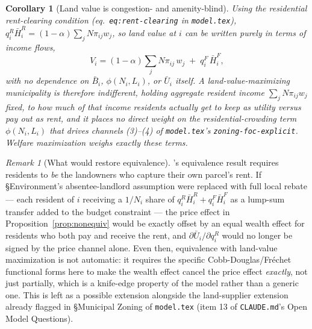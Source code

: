 \documentclass[12pt, a4paper]{article}
\theoremstyle{plain}
\newtheorem{corollary}{Corollary}[proposition]
\theoremstyle{remark}
\newtheorem*{remark}{Remark}
\begin{document}
\begin{corollary}[Land value is congestion- and amenity-blind]
\label{cor:blind}
Using the residential rent-clearing condition (eq.~\texttt{eq:rent-clearing} in \texttt{model.tex}), $q_i^R\bar H_i^R=(1-\alpha)\sum_j N\pi_{ij}w_j$, so land value at $i$ can be written purely in terms of income flows,
\[
V_i = (1-\alpha)\sum_j N\pi_{ij}\,w_j \;+\; q_i^F\,\bar H_i^F,
\]
with no dependence on $\bar B_i$, $\phi(N_i,L_i)$, or $\bar U_i$ itself. A land-value-maximizing municipality is therefore indifferent, \emph{holding aggregate resident income $\sum_jN\pi_{ij}w_j$ fixed}, to how much of that income residents actually get to keep as utility versus pay out as rent, and it places no direct weight on the residential-crowding term $\phi(N_i,L_i)$ that drives channels (3)–(4) of \texttt{model.tex}'s \texttt{zoning-foc-explicit}. Welfare maximization weighs exactly these terms.
\end{corollary}

\begin{remark}[What would restore equivalence]
\citet{Bordeu2026-df}'s equivalence result requires residents to \emph{be} the landowners who capture their own parcel's rent. If \S Environment's absentee-landlord assumption were replaced with full local rebate — each resident of $i$ receiving a $1/N_i$ share of $q_i^R\bar H_i^R+q_i^F\bar H_i^F$ as a lump-sum transfer added to the budget constraint — the price effect in Proposition~\ref{prop:nonequiv} would be exactly offset by an equal wealth effect for residents who both pay and receive the rent, and $\partial \bar U_i/\partial q_i^R$ would no longer be signed by the price channel alone. Even then, equivalence with land-value maximization is not automatic: it requires the specific Cobb-Douglas/Fréchet functional forms here to make the wealth effect cancel the price effect \emph{exactly}, not just partially, which is a knife-edge property of the model rather than a generic one. This is left as a possible extension alongside the land-supplier extension already flagged in \S Municipal Zoning of \texttt{model.tex} (item 13 of \texttt{CLAUDE.md}'s Open Model Questions).
\end{remark}

\printbibliography
\end{document}
